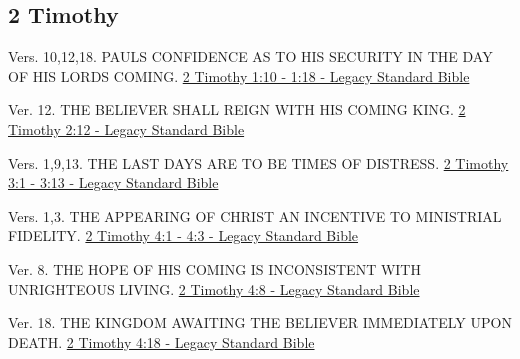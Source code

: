 \documentclass[
  ignorenonframetext,
]{beamer}
\begin{document}
\subsection{2 Timothy}\label{timothy-1}

\begin{frame}{1}
\label{section-229}
\begin{block}{Vers. 10,12,18. PAUL\textquotesingle S CONFIDENCE AS TO
HIS SECURITY IN THE DAY OF HIS LORD\textquotesingle S COMING.}
\label{vers.-101218.-pauls-confidence-as-to-his-security-in-the-day-of-his-lords-coming.}
\href{https://read.lsbible.org/?q=2tim1\%3A10-18}{2 Timothy 1:10 - 1:18
- Legacy Standard Bible}
\end{block}
\end{frame}

\begin{frame}{2}
\label{section-230}
\begin{block}{Ver. 12. THE BELIEVER SHALL REIGN WITH HIS COMING KING.}
\label{ver.-12.-the-believer-shall-reign-with-his-coming-king.}
\href{https://read.lsbible.org/?q=2tim2\%3A12}{2 Timothy 2:12 - Legacy
Standard Bible}
\end{block}
\end{frame}

\begin{frame}{3}
\label{section-231}
\begin{block}{Vers. 1,9,13. THE LAST DAYS ARE TO BE TIMES OF DISTRESS.}
\label{vers.-1913.-the-last-days-are-to-be-times-of-distress.}
\href{https://read.lsbible.org/?q=2tim3\%3A1-13}{2 Timothy 3:1 - 3:13 -
Legacy Standard Bible}
\end{block}
\end{frame}

\begin{frame}{4}
\label{section-232}
\begin{block}{Vers. 1,3. THE APPEARING OF CHRIST AN INCENTIVE TO
MINISTRIAL FIDELITY.}
\label{vers.-13.-the-appearing-of-christ-an-incentive-to-ministrial-fidelity.}
\href{https://read.lsbible.org/?q=2tim4\%3A1-3}{2 Timothy 4:1 - 4:3 -
Legacy Standard Bible}
\end{block}

\begin{block}{Ver. 8. THE HOPE OF HIS COMING IS INCONSISTENT WITH
UNRIGHTEOUS LIVING.}
\label{ver.-8.-the-hope-of-his-coming-is-inconsistent-with-unrighteous-living.}
\href{https://read.lsbible.org/?q=2tim4\%3A8}{2 Timothy 4:8 - Legacy
Standard Bible}
\end{block}

\begin{block}{Ver. 18. THE KINGDOM AWAITING THE BELIEVER IMMEDIATELY
UPON DEATH.}
\label{ver.-18.-the-kingdom-awaiting-the-believer-immediately-upon-death.}
\href{https://read.lsbible.org/?q=2tim4\%3A18}{2 Timothy 4:18 - Legacy
Standard Bible}
\end{block}
\end{frame}
\end{document}
